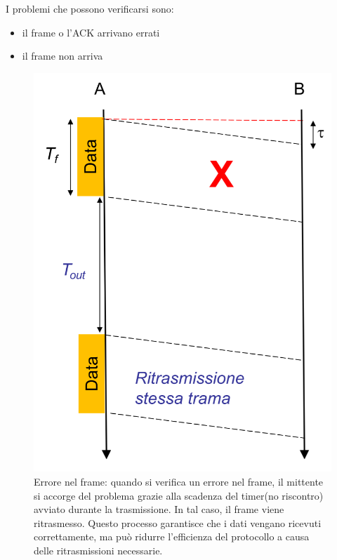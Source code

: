 I problemi che possono verificarsi sono:
\begin{multicols}{2}
\begin{itemize}
    \item il frame o l'ACK arrivano errati
    \item il frame non arriva
\end{itemize}
\end{multicols}

\begin{figure}[htbp]
    \centering
    \begin{minipage}{0.42\textwidth}
        \includegraphics[width=\linewidth]{images/erroreframe.png}
        \caption{Errore nel frame: quando si verifica un errore nel frame, il mittente si accorge del problema grazie alla scadenza del timer(no riscontro) avviato durante la trasmissione. 
        In tal caso, il frame viene ritrasmesso. Questo processo garantisce che i dati vengano ricevuti correttamente, ma può ridurre l'efficienza del protocollo a causa delle ritrasmissioni necessarie.}

\end{minipage}
\end{figure}
